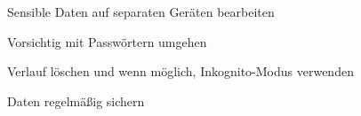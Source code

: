 \item Sensible Daten auf separaten Geräten bearbeiten
\item Vorsichtig mit Passwörtern umgehen
\item Verlauf löschen und wenn möglich, Inkognito-Modus verwenden
\item Daten regelmäßig sichern